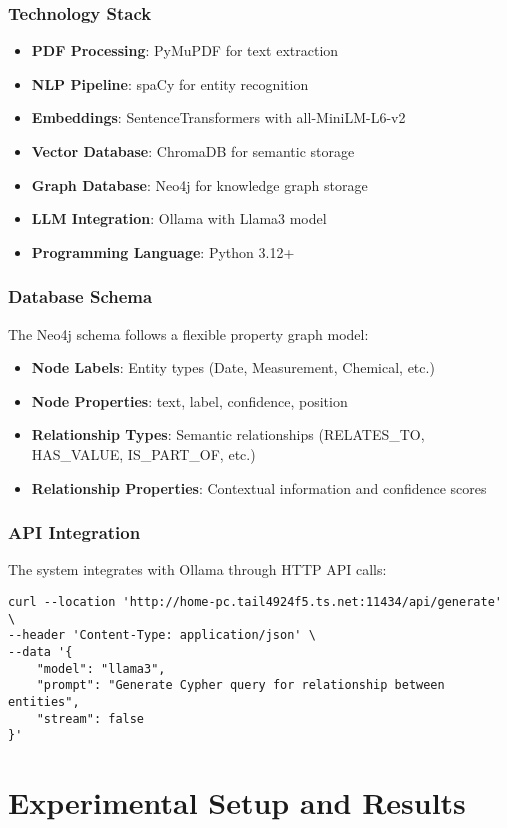 \documentclass[conference]{IEEEtran}
\begin{document}
\subsubsection{Technology Stack}
\begin{itemize}
\item \textbf{PDF Processing}: PyMuPDF for text extraction
\item \textbf{NLP Pipeline}: spaCy for entity recognition
\item \textbf{Embeddings}: SentenceTransformers with all-MiniLM-L6-v2
\item \textbf{Vector Database}: ChromaDB for semantic storage
\item \textbf{Graph Database}: Neo4j for knowledge graph storage
\item \textbf{LLM Integration}: Ollama with Llama3 model
\item \textbf{Programming Language}: Python 3.12+
\end{itemize}

\subsubsection{Database Schema}
The Neo4j schema follows a flexible property graph model:
\begin{itemize}
\item \textbf{Node Labels}: Entity types (Date, Measurement, Chemical, etc.)
\item \textbf{Node Properties}: text, label, confidence, position
\item \textbf{Relationship Types}: Semantic relationships (RELATES\_TO, HAS\_VALUE, IS\_PART\_OF, etc.)
\item \textbf{Relationship Properties}: Contextual information and confidence scores
\end{itemize}

\subsubsection{API Integration}
The system integrates with Ollama through HTTP API calls:
\begin{verbatim}
curl --location 'http://home-pc.tail4924f5.ts.net:11434/api/generate' \
--header 'Content-Type: application/json' \
--data '{
    "model": "llama3",
    "prompt": "Generate Cypher query for relationship between entities",
    "stream": false
}'
\end{verbatim}

\section{Experimental Setup and Results}
\end{document}
